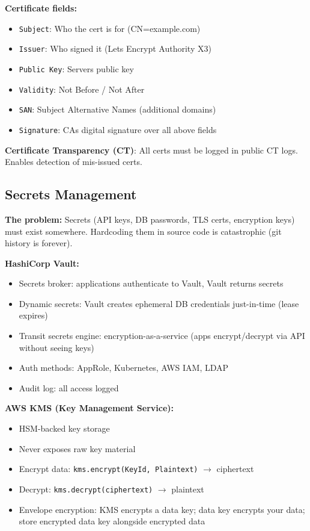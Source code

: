 \documentclass[11pt]{article}
\providecommand{\tightlist}{\setlength{\itemsep}{1pt}\setlength{\parskip}{0pt}}
\begin{document}
\textbf{Certificate fields:}

\begin{itemize}
\tightlist
\item
  \texttt{Subject}: Who the cert is for (CN=example.com)
\item
  \texttt{Issuer}: Who signed it (Let\textquotesingle s Encrypt Authority X3)
\item
  \texttt{Public\ Key}: Server\textquotesingle s public key
\item
  \texttt{Validity}: Not Before / Not After
\item
  \texttt{SAN}: Subject Alternative Names (additional domains)
\item
  \texttt{Signature}: CA\textquotesingle s digital signature over all above fields
\end{itemize}

\textbf{Certificate Transparency (CT)}: All certs must be logged in public CT logs. Enables detection of mis-issued certs.

\subsection{Secrets Management}\label{secrets-management}

\textbf{The problem:} Secrets (API keys, DB passwords, TLS certs, encryption keys) must exist somewhere. Hardcoding them in source code is catastrophic (git history is forever).

\textbf{HashiCorp Vault:}

\begin{itemize}
\tightlist
\item
  Secrets broker: applications authenticate to Vault, Vault returns secrets
\item
  Dynamic secrets: Vault creates ephemeral DB credentials just-in-time (lease expires)
\item
  Transit secrets engine: encryption-as-a-service (apps encrypt/decrypt via API without seeing keys)
\item
  Auth methods: AppRole, Kubernetes, AWS IAM, LDAP
\item
  Audit log: all access logged
\end{itemize}

\textbf{AWS KMS (Key Management Service):}

\begin{itemize}
\tightlist
\item
  HSM-backed key storage
\item
  Never exposes raw key material
\item
  Encrypt data: \texttt{kms.encrypt(KeyId,\ Plaintext)} \(\rightarrow\) ciphertext
\item
  Decrypt: \texttt{kms.decrypt(ciphertext)} \(\rightarrow\) plaintext
\item
  Envelope encryption: KMS encrypts a data key; data key encrypts your data; store encrypted data key alongside encrypted data
\end{itemize}
\end{document}
